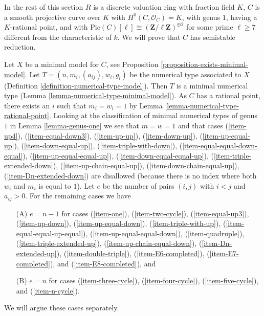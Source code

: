 \medskip\noindent
In the rest of this section
$R$ is a discrete valuation ring with fraction field $K$,
$C$ is a smooth projective curve over $K$ with $H^0(C, \mathcal{O}_C) = K$,
with genus $1$, having a $K$-rational point, and with
$\text{Pic}(C)[\ell] \cong (\mathbf{Z}/\ell \mathbf{Z})^{\oplus 2}$
for some prime $\ell \geq 7$ different from the characteristic of $k$.
We will prove that $C$ has semistable reduction.

\medskip\noindent
Let $X$ be a minimal model for $C$, see
Proposition \ref{proposition-exists-minimal-model}.
Let $T = (n, m_i, (a_{ij}), w_i, g_i)$
be the numerical type associated to $X$
(Definition \ref{definition-numerical-type-model}).
Then $T$ is a minimal numerical type
(Lemma \ref{lemma-numerical-type-minimal-model}).
As $C$ has a rational point, there exists an $i$
such that $m_i = w_i = 1$ by Lemma \ref{lemma-numerical-type-rational-point}.
Looking at the classification of minimal numerical types
of genus $1$ in Lemma \ref{lemma-genus-one}
we see that $m = w = 1$ and that cases
(\ref{item-up4}),
(\ref{item-equal-down3}),
(\ref{item-up-up}),
(\ref{item-down-up}),
(\ref{item-up-equal-up}),
(\ref{item-down-equal-up}),
(\ref{item-triple-with-down}),
(\ref{item-equal-equal-down-equal}),
(\ref{item-up-equal-equal-up}),
(\ref{item-down-equal-equal-up}),
(\ref{item-triple-extended-down}),
(\ref{item-up-chain-equal-up}),
(\ref{item-down-chain-equal-up}),
(\ref{item-Dn-extended-down}) are disallowed (because there is no
index where both $w_i$ and $m_i$ is equal to $1$).
Let $e$ be the number of pairs $(i, j)$ with $i < j$ and
$a_{ij} > 0$. For the remaining cases we have
\begin{enumerate}
\item[(A)] $e = n - 1$ for cases
(\ref{item-one}),
(\ref{item-two-cycle}),
(\ref{item-equal-up3}),
(\ref{item-up-down}),
(\ref{item-up-equal-down}),
(\ref{item-triple-with-up}),
(\ref{item-equal-equal-up-equal}),
(\ref{item-up-equal-equal-down}),
(\ref{item-quadruple}),
(\ref{item-triple-extended-up}),
(\ref{item-up-chain-equal-down}),
(\ref{item-Dn-extended-up}),
(\ref{item-double-triple}),
(\ref{item-E6-completed}),
(\ref{item-E7-completed}), and
(\ref{item-E8-completed}), and
\item[(B)] $e = n$ for cases
(\ref{item-three-cycle}),
(\ref{item-four-cycle}),
(\ref{item-five-cycle}), and
(\ref{item-n-cycle}).
\end{enumerate}
We will argue these cases separately.

